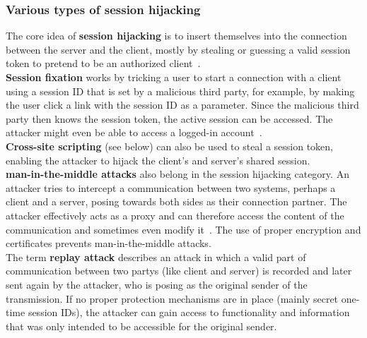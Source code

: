 \documentclass[
a4paper,
pagesize,
pdftex,
12pt,
twoside, %
BCOR=5mm, %
ngerman,
fleqn,
final,
]{scrartcl}
\begin{document}
	
	\subsubsection{Various types of session hijacking}
	The core idea of \textbf{session hijacking} is to insert themselves into the connection between the server and the client, mostly by stealing or guessing a valid session token to pretend to be an authorized client~\cite{OWASPFoundation.14.8.2014}.\\
	\textbf{Session fixation} works by tricking a user to start a connection with a client using a session ID that is set by a malicious third party, for example, by making the user click a link with the session ID as a parameter. Since the malicious third party then knows the session token, the active session can be accessed. The attacker might even be able to access a logged-in account~\cite{OWASPFoundation.14.8.2014}.\\
	\textbf{Cross-site scripting} (see below) can also be used to steal a session token, enabling the attacker to hijack the client's and server's shared session.\\
	\textbf{man-in-the-middle attacks} also belong in the session hijacking category. An attacker tries to intercept a communication between two systems, perhaps a client and a server, posing towards both sides as their connection partner. The attacker effectively acts as a proxy and can therefore access the content of the communication and sometimes even modify it~\cite{OWASPFoundation.31.8.2015}. The use of proper encryption and certificates prevents man-in-the-middle attacks.\\
	The term \textbf{replay attack} describes an attack in which a valid part of communication between two partys (like client and server) is recorded and later sent again by the attacker, who is posing as the original sender of the transmission. If no proper protection mechanisms are in place (mainly secret one-time session IDs), the attacker can gain access to functionality and information that was only intended to be accessible for the original sender.
	
\end{document}
